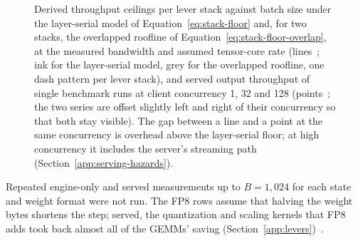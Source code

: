 \begin{figure}[htbp]
\centering
%
\caption{Derived throughput ceilings per lever stack against batch size under the layer-serial model of Equation~\eqref{eq:stack-floor} and, for two stacks, the overlapped roofline of Equation~\eqref{eq:stack-floor-overlap}, at the measured bandwidth and assumed tensor-core rate (lines~; ink for the layer-serial model, grey for the overlapped roofline, one dash pattern per lever stack), and served output throughput of single benchmark runs at client concurrency 1, 32 and 128 (points~; the two series are offset slightly left and right of their concurrency so that both stay visible). The gap between a line and a point at the same concurrency is overhead above the layer-serial floor; at high concurrency it includes the server's streaming path (Section~\ref{app:serving-hazards}).}
\label{fig:stack-ceilings}
\end{figure}

Repeated engine-only and served measurements up to $B=1{,}024$ for each state and weight format were not run. The FP8 rows assume that halving the weight bytes shortens the step; served, the quantization and scaling kernels that FP8 adds took back almost all of the GEMMs' saving (Section~\ref{app:levers})~.

